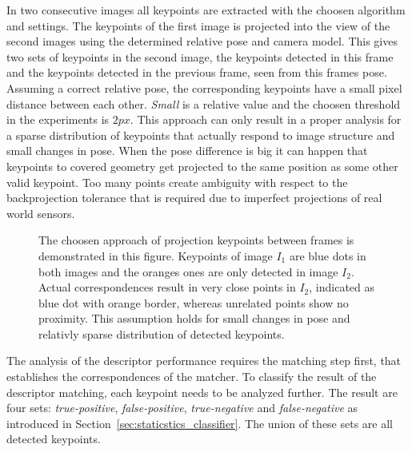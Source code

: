 In two consecutive images all keypoints are extracted with the choosen algorithm and settings.
The keypoints of the first image is projected into the view of the second images using the determined relative pose and camera model.
This gives two sets of keypoints in the second image, the keypoints detected in this frame and the keypoints detected in the previous frame, seen from this frames pose.
Assuming a correct relative pose, the corresponding keypoints have a small pixel distance between each other.
\emph{Small} is a relative value and the choosen threshold in the experiments is $2px$.
This approach can only result in a proper analysis for a sparse distribution of keypoints that actually respond to image structure and small changes in pose.
When the pose difference is big it can happen that keypoints to covered geometry get projected to the same position as some other valid keypoint.
Too many points create ambiguity with respect to the backprojection tolerance that is required due to imperfect projections of real world sensors.
\begin{figure}[H]
    
    \caption{The choosen approach of projection keypoints between frames is demonstrated in this figure. Keypoints of image $I_1$ are blue dots in both images and the oranges ones are only detected in image $I_2$. Actual correspondences result in very close points in $I_2$, indicated as blue dot with orange border, whereas unrelated points show no proximity. This assumption holds for small changes in pose and relativly sparse distribution of detected keypoints.}
\end{figure}
The analysis of the descriptor performance requires the matching step first, that establishes the correspondences of the matcher.
To classify the result of the descriptor matching, each keypoint needs to be analyzed further.
The result are four sets: \emph{true-positive}, \emph{false-positive}, \emph{true-negative} and \emph{false-negative} as introduced in Section~\ref{sec:staticstics_classifier}.
The union of these sets are all detected keypoints.

